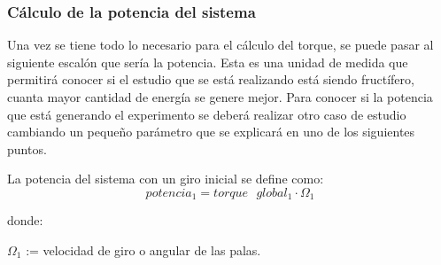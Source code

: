  
 \subsubsection{Cálculo de la potencia del sistema}
 
 Una vez se tiene todo lo necesario para el cálculo del torque, se puede pasar al siguiente escalón que sería la potencia. Esta es una unidad de medida que permitirá conocer si el estudio que se está realizando está siendo fructífero, cuanta mayor cantidad de energía se genere mejor. Para conocer si la potencia que está generando el experimento se deberá realizar otro caso de estudio cambiando un pequeño parámetro que se explicará en uno de los siguientes puntos.
 
  \begin{definicion}
 La potencia del sistema con un giro inicial se define como:
 $$ potencia_1 = torque \text{ } global_1 \cdot \Omega_1 $$ 
 
 donde:
 
  \centering $\Omega_1$ := velocidad de giro o angular de las palas.
 \label{def:fuerza_viento}
 \end{definicion}
 
 